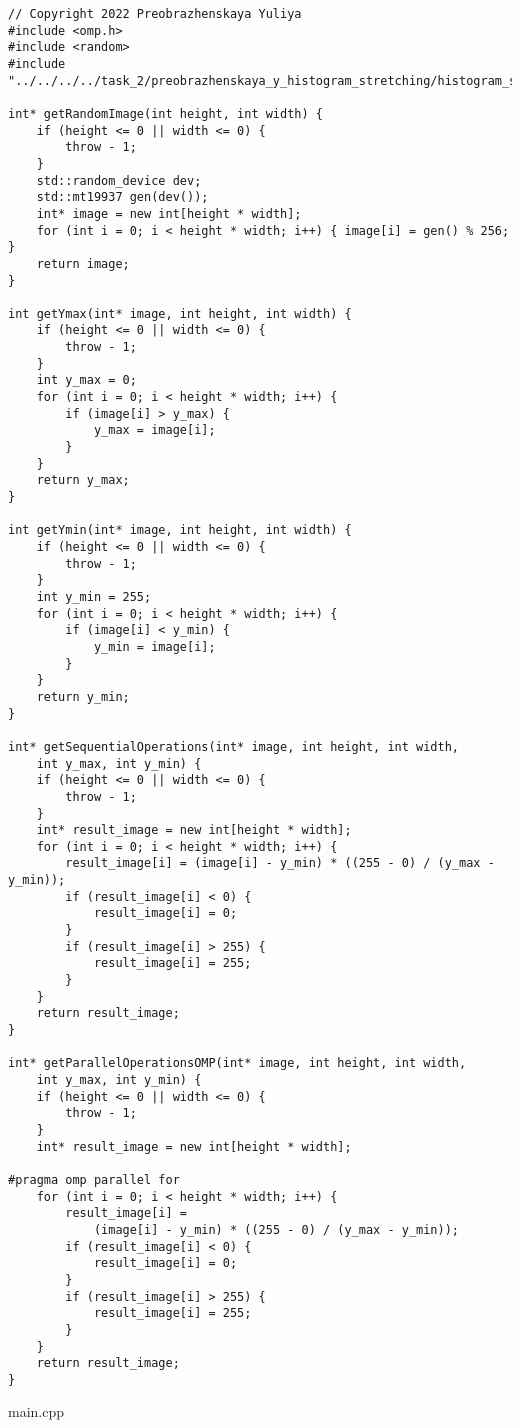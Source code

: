 \documentclass{report}
\begin{document}
\begin{lstlisting}
// Copyright 2022 Preobrazhenskaya Yuliya
#include <omp.h>
#include <random>
#include "../../../../task_2/preobrazhenskaya_y_histogram_stretching/histogram_stretching.h"

int* getRandomImage(int height, int width) {
    if (height <= 0 || width <= 0) {
        throw - 1;
    }
    std::random_device dev;
    std::mt19937 gen(dev());
    int* image = new int[height * width];
    for (int i = 0; i < height * width; i++) { image[i] = gen() % 256; }
    return image;
}

int getYmax(int* image, int height, int width) {
    if (height <= 0 || width <= 0) {
        throw - 1;
    }
    int y_max = 0;
    for (int i = 0; i < height * width; i++) {
        if (image[i] > y_max) {
            y_max = image[i];
        }
    }
    return y_max;
}

int getYmin(int* image, int height, int width) {
    if (height <= 0 || width <= 0) {
        throw - 1;
    }
    int y_min = 255;
    for (int i = 0; i < height * width; i++) {
        if (image[i] < y_min) {
            y_min = image[i];
        }
    }
    return y_min;
}

int* getSequentialOperations(int* image, int height, int width,
    int y_max, int y_min) {
    if (height <= 0 || width <= 0) {
        throw - 1;
    }
    int* result_image = new int[height * width];
    for (int i = 0; i < height * width; i++) {
        result_image[i] = (image[i] - y_min) * ((255 - 0) / (y_max - y_min));
        if (result_image[i] < 0) {
            result_image[i] = 0;
        }
        if (result_image[i] > 255) {
            result_image[i] = 255;
        }
    }
    return result_image;
}

int* getParallelOperationsOMP(int* image, int height, int width,
    int y_max, int y_min) {
    if (height <= 0 || width <= 0) {
        throw - 1;
    }
    int* result_image = new int[height * width];

#pragma omp parallel for
    for (int i = 0; i < height * width; i++) {
        result_image[i] =
            (image[i] - y_min) * ((255 - 0) / (y_max - y_min));
        if (result_image[i] < 0) {
            result_image[i] = 0;
        }
        if (result_image[i] > 255) {
            result_image[i] = 255;
        }
    }
    return result_image;
}
\end{lstlisting}
main.cpp
\end{document}
